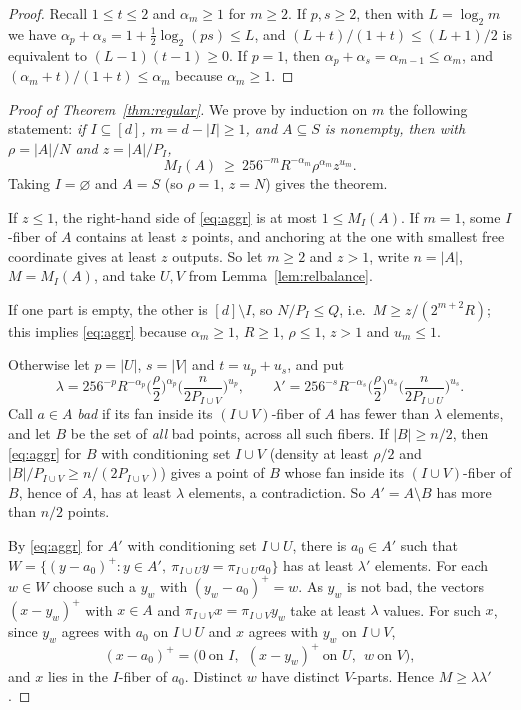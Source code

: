 \documentclass[11pt]{amsart}
\theoremstyle{definition}
\theoremstyle{remark}
\newcommand{\Mf}{M}
\begin{document}
\begin{proof}
Recall $1\le t\le2$ and $\alpha_m\ge1$ for $m\ge2$. If $p,s\ge2$, then with $L=\log_2m$ we have $\alpha_p+\alpha_s=1+\tfrac12\log_2(ps)\le L$, and $(L+t)/(1+t)\le(L+1)/2$ is equivalent to $(L-1)(t-1)\ge0$. If $p=1$, then $\alpha_p+\alpha_s=\alpha_{m-1}\le\alpha_m$, and $(\alpha_m+t)/(1+t)\le\alpha_m$ because $\alpha_m\ge1$.
\end{proof}

\begin{proof}[Proof of Theorem~\ref{thm:regular}]
We prove by induction on $m$ the following statement: \emph{if $I\subseteq[d]$, $m=d-|I|\ge1$, and $A\subseteq S$ is nonempty, then with $\rho=|A|/N$ and $z=|A|/P_I$,}
\begin{equation}\label{eq:aggr}
\Mf_I(A)\ \ge\ 256^{-m}R^{-\alpha_m}\rho^{\alpha_m}z^{u_m}.
\end{equation}
Taking $I=\varnothing$ and $A=S$ (so $\rho=1$, $z=N$) gives the theorem.

If $z\le1$, the right-hand side of \eqref{eq:aggr} is at most $1\le\Mf_I(A)$. If $m=1$, some $I$-fiber of $A$ contains at least $z$ points, and anchoring at the one with smallest free coordinate gives at least $z$ outputs. So let $m\ge2$ and $z>1$, write $n=|A|$, $\Mf=\Mf_I(A)$, and take $U,V$ from Lemma~\ref{lem:relbalance}.

If one part is empty, the other is $[d]\setminus I$, so $N/P_I\le Q$, i.e.\ $\Mf\ge z/(2^{m+2}R)$; this implies \eqref{eq:aggr} because $\alpha_m\ge1$, $R\ge1$, $\rho\le1$, $z>1$ and $u_m\le1$.

Otherwise let $p=|U|$, $s=|V|$ and $t=u_p+u_s$, and put
\[
\lambda=256^{-p}R^{-\alpha_p}\Big(\frac\rho2\Big)^{\alpha_p}\Big(\frac{n}{2P_{I\cup V}}\Big)^{u_p},
\qquad
\lambda'=256^{-s}R^{-\alpha_s}\Big(\frac\rho2\Big)^{\alpha_s}\Big(\frac{n}{2P_{I\cup U}}\Big)^{u_s}.
\]
Call $a\in A$ \emph{bad} if its fan inside its $(I\cup V)$-fiber of $A$ has fewer than $\lambda$ elements, and let $B$ be the set of \emph{all} bad points, across all such fibers. If $|B|\ge n/2$, then \eqref{eq:aggr} for $B$ with conditioning set $I\cup V$ (density at least $\rho/2$ and $|B|/P_{I\cup V}\ge n/(2P_{I\cup V})$) gives a point of $B$ whose fan inside its $(I\cup V)$-fiber of $B$, hence of $A$, has at least $\lambda$ elements, a contradiction. So $A'=A\setminus B$ has more than $n/2$ points.

By \eqref{eq:aggr} for $A'$ with conditioning set $I\cup U$, there is $a_0\in A'$ such that $W=\{(y-a_0)^+:y\in A',\ \pi_{I\cup U}y=\pi_{I\cup U}a_0\}$ has at least $\lambda'$ elements. For each $w\in W$ choose such a $y_w$ with $(y_w-a_0)^+=w$. As $y_w$ is not bad, the vectors $(x-y_w)^+$ with $x\in A$ and $\pi_{I\cup V}x=\pi_{I\cup V}y_w$ take at least $\lambda$ values. For such $x$, since $y_w$ agrees with $a_0$ on $I\cup U$ and $x$ agrees with $y_w$ on $I\cup V$,
\[
(x-a_0)^+=\big(0\ \text{on }I,\ \ (x-y_w)^+\ \text{on }U,\ \ w\ \text{on }V\big),
\]
and $x$ lies in the $I$-fiber of $a_0$. Distinct $w$ have distinct $V$-parts. Hence $\Mf\ge\lambda\lambda'$.


\end{proof}
\end{document}

